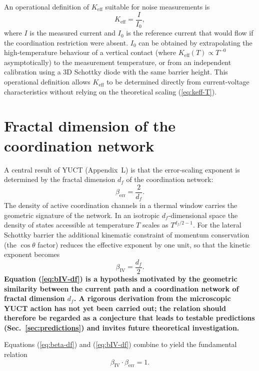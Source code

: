 \documentclass[12pt,a4paper]{article}
\newcommand{\Keff}{K_{\mathrm{eff}}}
\begin{document}
	An operational definition of $\Keff$ suitable for noise measurements
	is
	\begin{equation}
		\Keff = \frac{I}{I_0},
		\label{eq:keff-operational}
	\end{equation}
	where $I$ is the measured current and $I_0$ is the reference current
	that would flow if the coordination restriction were absent. $I_0$ can
	be obtained by extrapolating the high‑temperature behaviour of a
	vertical contact (where $\Keff(T) \propto T^{-0}$ asymptotically) to
	the measurement temperature, or from an independent calibration using
	a 3D Schottky diode with the same barrier height. This operational
	definition allows $\Keff$ to be determined directly from
	current‑voltage characteristics without relying on the theoretical
	scaling (\ref{eq:keff-T}).
	
	\section{Fractal dimension of the coordination network}
	
	A central result of YUCT (Appendix~L) is that the error‑scaling
	exponent is determined by the fractal dimension $d_f$ of the
	coordination network:
	\begin{equation}
		\beta_{\mathrm{err}} = \frac{2}{d_f}.
		\label{eq:beta-df}
	\end{equation}
	The density of active coordination channels in a thermal window
	carries the geometric signature of the network. In an isotropic
	$d_f$‑dimensional space the density of states accessible at
	temperature $T$ scales as $T^{d_f/2 - 1}$. For the lateral
	Schottky barrier the additional kinematic constraint of momentum
	conservation (the $\cos\theta$ factor) reduces the effective
	exponent by one unit, so that the kinetic exponent becomes
	\begin{equation}
		\beta_{\mathrm{IV}} = \frac{d_f}{2}.
		\label{eq:bIV-df}
	\end{equation}
	\textbf{Equation (\ref{eq:bIV-df}) is a hypothesis motivated by
		the geometric similarity between the current path and a
		coordination network of fractal dimension $d_f$. A rigorous
		derivation from the microscopic YUCT action has not yet been
		carried out; the relation should therefore be regarded as a
		conjecture that leads to testable predictions (Sec.~\ref{sec:predictions})
		and invites future theoretical investigation.}
	
	Equations (\ref{eq:beta-df}) and (\ref{eq:bIV-df}) combine to
	yield the fundamental relation
	\begin{equation}
		\boxed{\beta_{\mathrm{IV}} \cdot \beta_{\mathrm{err}} = 1}.
		\label{eq:relation}
	\end{equation}
	
\end{document}
